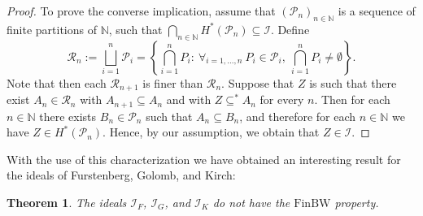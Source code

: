 \documentclass{amsart}
\newtheorem{thm}{Theorem}[section]
\theoremstyle{definition}
\theoremstyle{definition}
\newcommand{\N}{{\mathbb N}}
\newcommand{\I}{\mathcal I}
\newcommand{\finbw}{\text{FinBW}}
\begin{document}
\begin{proof}
To prove the converse implication, assume that $(\mathcal{P}_n)_{n\in\N}$ is a sequence of finite partitions of $\N$, such that $\bigcap_{n\in\N}{H^{*}(\mathcal{P}_n)} \subseteq \I$. Define 
$$\mathcal{R}_n := \bigsqcup_{i=1}^{n}{\mathcal{P}_i} = \left\{\bigcap_{i=1}^{n}{P_i} :\ \forall_{i=1,\ldots,n}\ P_i\in\mathcal{P}_i,\ \bigcap_{i=1}^{n}{P_i}\neq\emptyset\right\}.$$
Note that then each $\mathcal{R}_{n+1}$ is finer than $\mathcal{R}_n$.
Suppose that $Z$ is such that there exist $A_n \in \mathcal{R}_n$ with $A_{n+1} \subseteq A_n$ and with $Z \subseteq^* A_n$ for every $n$. Then for each $n\in\N$ there exists $B_n \in \mathcal{P}_n$ such that $A_n \subseteq B_n$, and therefore for each $n\in\N$ we have $Z \in H^{*}(\mathcal{P}_n)$. Hence, by our assumption, we obtain that $Z\in\I$.
%
%
\end{proof}

With the use of this characterization we have obtained an interesting result for the ideals of Furstenberg, Golomb, and Kirch:

\begin{thm}
The ideals $\I_F$, $\I_G$, and $\I_K$ do not have the $\finbw$ property.
\end{thm}
\end{document}

